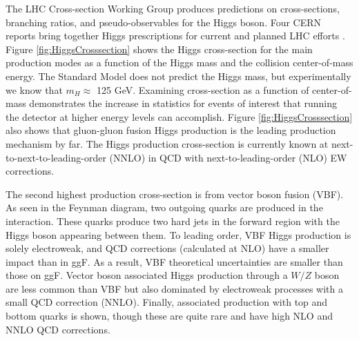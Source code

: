 The LHC Cross-section Working Group produces predictions on cross-sections, branching ratios, and pseudo-observables for the Higgs boson. Four CERN reports bring together Higgs prescriptions for current and planned LHC efforts \cite{LHCCrossSectionWG}. Figure \ref{fig:HiggsCrosssection} shows the Higgs cross-section for the main production modes as a function of the Higgs mass and the collision center-of-mass energy. The Standard Model does not predict the Higgs mass, but experimentally we know that $m_H\approx$ 125 GeV. Examining cross-section as a function of center-of-mass demonstrates the increase in statistics for events of interest that running the detector at higher energy levels can accomplish. Figure \ref{fig:HiggsCrosssection} also shows that gluon-gluon fusion Higgs production is the leading production mechanism by far. The Higgs production cross-section is currently known at next-to-next-to-leading-order (NNLO) in QCD with next-to-leading-order (NLO) EW corrections. 

The second highest production cross-section is from vector boson fusion (VBF). As seen in the Feynman diagram, two outgoing quarks are produced in the interaction. These quarks produce two hard jets in the forward region with the Higgs boson appearing between them. To leading order, VBF Higgs production is solely electroweak, and QCD corrections (calculated at NLO) have a smaller impact than in ggF. As a result, VBF theoretical uncertainties are smaller than those on ggF. Vector boson associated Higgs production through a $W/Z$ boson are less common than VBF but also dominated by electroweak processes with a small QCD correction (NNLO). Finally, associated production with top and bottom quarks is shown, though these are quite rare and have high NLO and NNLO QCD corrections. 

